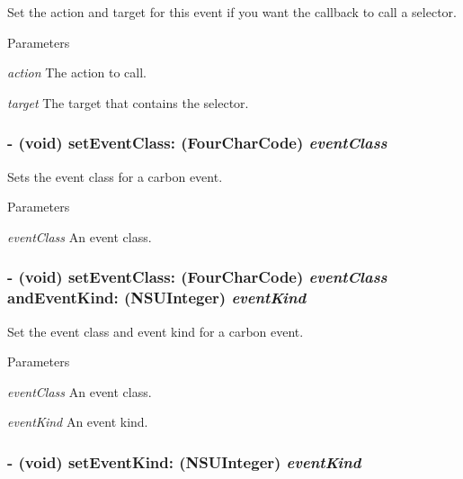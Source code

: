 Set the action and target for this event if you want the callback to call a selector. 
\begin{DoxyParams}{Parameters}
\item[{\em action}]The action to call. \item[{\em target}]The target that contains the selector. \end{DoxyParams}
\hypertarget{interface_g_d_carbon_event_ae4c7f30d07acf8e89dc778dde1dedc8d}{
\subsubsection[{setEventClass:}]{\setlength{\rightskip}{0pt plus 5cm}-\/ (void) setEventClass: (FourCharCode) {\em eventClass}}}
\label{interface_g_d_carbon_event_ae4c7f30d07acf8e89dc778dde1dedc8d}


Sets the event class for a carbon event. 
\begin{DoxyParams}{Parameters}
\item[{\em eventClass}]An event class. \end{DoxyParams}
\hypertarget{interface_g_d_carbon_event_a4e873892d751951433ef76ae3de88fad}{
\subsubsection[{setEventClass:andEventKind:}]{\setlength{\rightskip}{0pt plus 5cm}-\/ (void) setEventClass: (FourCharCode) {\em eventClass}\/ andEventKind: (NSUInteger) {\em eventKind}}}
\label{interface_g_d_carbon_event_a4e873892d751951433ef76ae3de88fad}


Set the event class and event kind for a carbon event. 
\begin{DoxyParams}{Parameters}
\item[{\em eventClass}]An event class. \item[{\em eventKind}]An event kind. \end{DoxyParams}
\hypertarget{interface_g_d_carbon_event_ab62393c9ce0c0d7caed4dbe9f59dad04}{
\subsubsection[{setEventKind:}]{\setlength{\rightskip}{0pt plus 5cm}-\/ (void) setEventKind: (NSUInteger) {\em eventKind}}}
\label{interface_g_d_carbon_event_ab62393c9ce0c0d7caed4dbe9f59dad04}


